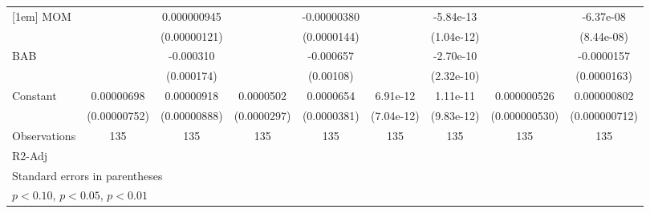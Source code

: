 \begin{table}[htbp]
\begin{tabular}{l*{8}{c}}
[1em]
MOM                 &                     & 0.000000945         &                     & -0.00000380         &                     &   -5.84e-13         &                     &   -6.37e-08         \\
                    &                     &(0.00000121)         &                     & (0.0000144)         &                     &  (1.04e-12)         &                     &  (8.44e-08)         \\
[1em]
BAB                 &                     &   -0.000310\sym{*}  &                     &   -0.000657         &                     &   -2.70e-10         &                     &  -0.0000157         \\
                    &                     &  (0.000174)         &                     &   (0.00108)         &                     &  (2.32e-10)         &                     & (0.0000163)         \\
[1em]
Constant            &  0.00000698         &  0.00000918         &   0.0000502\sym{*}  &   0.0000654\sym{*}  &    6.91e-12         &    1.11e-11         & 0.000000526         & 0.000000802         \\
                    &(0.00000752)         &(0.00000888)         & (0.0000297)         & (0.0000381)         &  (7.04e-12)         &  (9.83e-12)         &(0.000000530)         &(0.000000712)         \\
\hline
Observations        &         135         &         135         &         135         &         135         &         135         &         135         &         135         &         135         \\
R2-Adj              &                     &                     &                     &                     &                     &                     &                     &                     \\
\hline\hline
\multicolumn{9}{l}{\footnotesize Standard errors in parentheses}\\
\multicolumn{9}{l}{\footnotesize \sym{*} \(p<0.10\), \sym{**} \(p<0.05\), \sym{***} \(p<0.01\)}\\
\end{tabular}
\end{table}
